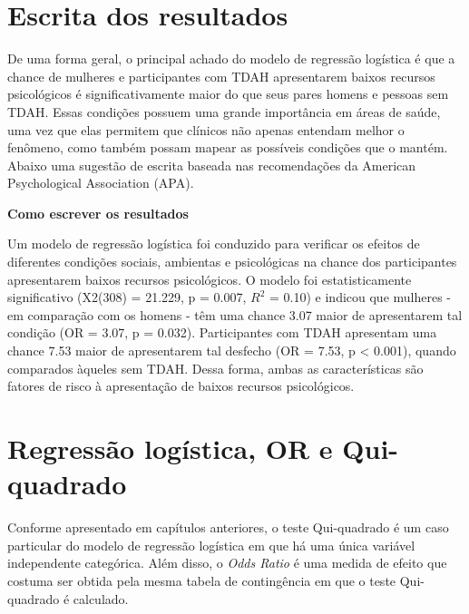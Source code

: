 \documentclass[
]{book}
\newenvironment{writing}{
  \definecolor{shadecolor}{rgb}{0, 0, 0}  %
  \color{white}
  \begin{shaded}}
 {\end{shaded}}
\begin{document}
\hypertarget{escrita-dos-resultados-6}{%
\section{Escrita dos resultados}\label{escrita-dos-resultados-6}}

De uma forma geral, o principal achado do modelo de regressão logística é que a chance de mulheres e participantes com TDAH apresentarem baixos recursos psicológicos é significativamente maior do que seus pares homens e pessoas sem TDAH. Essas condições possuem uma grande importância em áreas de saúde, uma vez que elas permitem que clínicos não apenas entendam melhor o fenômeno, como também possam mapear as possíveis condições que o mantém. Abaixo uma sugestão de escrita baseada nas recomendações da American Psychological Association (APA).

\begin{writing}

\textbf{Como escrever os resultados}

Um modelo de regressão logística foi conduzido para verificar os efeitos de diferentes condições sociais, ambientas e psicológicas na chance dos participantes apresentarem baixos recursos psicológicos. O modelo foi estatisticamente significativo (X2(308) = 21.229, p = 0.007, \(R^2\) = 0.10) e indicou que mulheres - em comparação com os homens - têm uma chance 3.07 maior de apresentarem tal condição (OR = 3.07, p = 0.032). Participantes com TDAH apresentam uma chance 7.53 maior de apresentarem tal desfecho (OR = 7.53, p \textless{} 0.001), quando comparados àqueles sem TDAH. Dessa forma, ambas as características são fatores de risco à apresentação de baixos recursos psicológicos.

\end{writing}

\hypertarget{regressuxe3o-loguxedstica-or-e-qui-quadrado}{%
\section{Regressão logística, OR e Qui-quadrado}\label{regressuxe3o-loguxedstica-or-e-qui-quadrado}}

Conforme apresentado em capítulos anteriores, o teste Qui-quadrado é um caso particular do modelo de regressão logística em que há uma única variável independente categórica. Além disso, o \emph{Odds Ratio} é uma medida de efeito que costuma ser obtida pela mesma tabela de contingência em que o teste Qui-quadrado é calculado.
\end{document}

